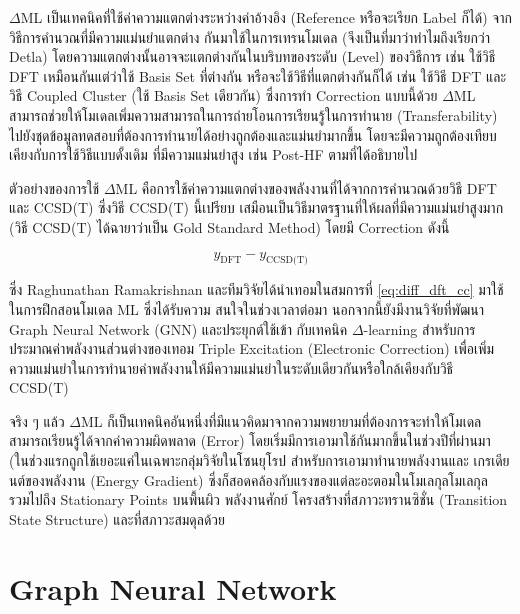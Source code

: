 $\Delta$ML เป็นเทคนิคที่ใช้ค่าความแตกต่างระหว่างค่าอ้างอิง (Reference หรือจะเรียก Label ก็ได้) จากวิธีการคำนวณที่มีความแม่นยำแตกต่าง%
กันมาใช้ในการเทรนโมเดล (จึงเป็นที่มาว่าทำไมถึงเรียกว่า Detla) โดยความแตกต่างนั้นอาจจะแตกต่างกันในบริบทของระดับ (Level) ของวิธีการ 
เช่น ใช้วิธี DFT เหมือนกันแต่ว่าใช้ Basis Set ที่ต่างกัน หรือจะใช้วิธีที่แตกต่างกันก็ได้ เช่น ใช้วิธี DFT และวิธี Coupled Cluster (ใช้ Basis 
Set เดียวกัน) ซึ่งการทำ Correction แบบนี้ด้วย $\Delta$ML สามารถช่วยให้โมเดลเพิ่มความสามารถในการถ่ายโอนการเรียนรู้ในการทำนาย 
(Transferability) ไปยังชุดข้อมูลทดสอบที่ต้องการทำนายได้อย่างถูกต้องและแม่นยำมากขึ้น โดยจะมีความถูกต้องเทียบเคียงกับการใช้วิธีแบบดั้งเดิม%
ที่มีความแม่นยำสูง เช่น Post-HF ตามที่ได้อธิบายไป 

ตัวอย่างของการใช้ $\Delta$ML คือการใช้ค่าความแตกต่างของพลังงานที่ได้จากการคำนวณด้วยวิธี DFT และ CCSD(T) ซึ่งวิธี CCSD(T) นี้เปรียบ%
เสมือนเป็นวิธีมาตรฐานที่ให้ผลที่มีความแม่นยำสูงมาก (วิธี CCSD(T) ได้ฉายาว่าเป็น Gold Standard Method) โดยมี Correction ดังนี้

\begin{equation}\label{eq:diff_dft_cc}
    y_{\text{DFT}} - y_{\text{CCSD(T)}}
\end{equation}

ซึ่ง Raghunathan Ramakrishnan และทีมวิจัยได้นำเทอมในสมการที่ \ref{eq:diff_dft_cc} มาใช้ในการฝึกสอนโมเดล ML ซึ่งได้รับความ%
สนใจในช่วงเวลาต่อมา\autocite{ramakrishnan2015a} นอกจากนี้ยังมีงานวิจัยที่พัฒนา Graph Neural Network (GNN) และประยุกต์ใช้เข้า%
กับเทคนิค $\Delta$-learning สำหรับการประมาณค่าพลังงานส่วนต่างของเทอม Triple Excitation (Electronic Correction) 
เพื่อเพิ่มความแม่นยำในการทำนายค่าพลังงานให้มีความแม่นยำในระดับเดียวกันหรือใกล้เคียงกับวิธี CCSD(T)\autocite{ruth2022}

จริง ๆ แล้ว $\Delta$ML ก็เป็นเทคนิคอันหนึ่งที่มีแนวคิดมาจากความพยายามที่ต้องการจะทำให้โมเดลสามารถเรียนรู้ได้จากค่าความผิดพลาด (Error) 
โดยเริ่มมีการเอามาใช้กันมากขึ้นในช่วงปีที่ผ่านมา (ในช่วงแรกถูกใช้เยอะแค่ในเฉพาะกลุ่มวิจัยในโซนยุโรป สำหรับการเอามาทำนายพลังงานและ%
เกรเดียนต์ของพลังงาน (Energy Gradient) ซึ่งก็สอดคล้องกับแรงของแต่ละอะตอมในโมเลกุลโมเลกุล รวมไปถึง Stationary Points บนพื้นผิว%
พลังงานศักย์ โครงสร้างที่สภาวะทรานซิชั่น (Transition State Structure) และที่สภาวะสมดุลด้วย

\section{Graph Neural Network}
\label{sec:gnn}

